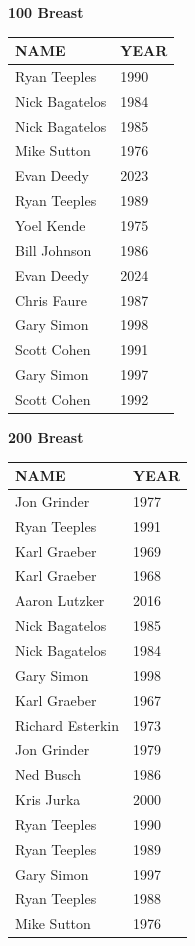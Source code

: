 \begin{table}[H]
\centering
\begin{minipage}[t]{0.48\textwidth}
\centering
\textbf{100 Breast}\\[0.1cm]
\begin{tabular}{@{}p{2.8cm}p{1.2cm}@{}}
\hline
    \textbf{NAME} & \textbf{YEAR} \\
\hline
    Ryan Teeples & 1990 \\
    Nick Bagatelos & 1984 \\
    Nick Bagatelos & 1985 \\
    Mike Sutton & 1976 \\
    Evan Deedy & 2023 \\
    Ryan Teeples & 1989 \\
    Yoel Kende & 1975 \\
    Bill Johnson & 1986 \\
    Evan Deedy & 2024 \\
    Chris Faure & 1987 \\
    Gary Simon & 1998 \\
    Scott Cohen & 1991 \\
    Gary Simon & 1997 \\
    Scott Cohen & 1992 \\
\hline
\end{tabular}
\end{minipage}\hfill
\begin{minipage}[t]{0.48\textwidth}
\centering
\textbf{200 Breast}\\[0.1cm]
\begin{tabular}{@{}p{2.8cm}p{1.2cm}@{}}
\hline
    \textbf{NAME} & \textbf{YEAR} \\
\hline
    Jon Grinder & 1977 \\
    Ryan Teeples & 1991 \\
    Karl Graeber & 1969 \\
    Karl Graeber & 1968 \\
    Aaron Lutzker & 2016 \\
    Nick Bagatelos & 1985 \\
    Nick Bagatelos & 1984 \\
    Gary Simon & 1998 \\
    Karl Graeber & 1967 \\
    Richard Esterkin & 1973 \\
    Jon Grinder & 1979 \\
    Ned Busch & 1986 \\
    Kris Jurka & 2000 \\
    Ryan Teeples & 1990 \\
    Ryan Teeples & 1989 \\
    Gary Simon & 1997 \\
    Ryan Teeples & 1988 \\
    Mike Sutton & 1976 \\
\hline
\end{tabular}
\end{minipage}
\end{table}

